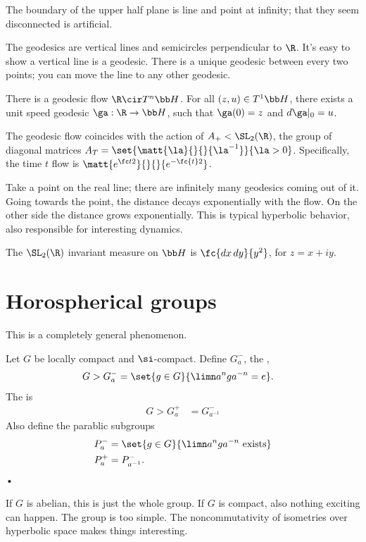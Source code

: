The boundary of the upper half plane is line and point at infinity; that they seem disconnected is artificial.

The geodesics are vertical lines and semicircles perpendicular to $\R$. It's easy to show a vertical line is a geodesic. There is a unique geodesic between every two points; you can move the line to any other geodesic.

There is a geodesic flow $\R\cir T^n\bb H$. For all $(z,u)\in T^1\bb H$, there exists a unit speed geodesic $\ga:\R\to \bb H$, such that $\ga(0)=z$ and $d\ga|_0=u$. %

\begin{pr}
The geodesic flow coincides with the action of $A_+<\SL_2(\R)$, the group of diagonal matrices $A_T=\set{\matt{\la}{}{}{\la^{-1}}}{\la >0}$. Specifically, the time $t$ flow is $\matt{e^{\fc t2}}{}{}{e^{-\fc{t}2}}$. 
\end{pr}
Take a point on the real line; there are infinitely many geodesics coming out of it.
Going towards the point, the distance decays exponentially with the flow.
On the other side the distance grows exponentially. This is typical hyperbolic behavior, also responsible for interesting dynamics.

The $\SL_2(\R)$ invariant measure on $\bb H$ is $\fc{dx\,dy}{y^2}$, for $z=x+iy$. 
\section{Horospherical groups}

This is a completely general phenomenon. 
\begin{df}
Let $G$ be locally compact and $\si$-compact. 
Define $G_a^-$, the ,
\begin{align}
G>G_a^- & = \set{g\in G}{\limn a^n g a^{-n}=e}.
\end{align}
The  is
\begin{align}
G>G_a^+& = G_{a^{-1}}^-
\end{align}
Also define the parablic subgroups
\begin{align}
P_a^- &= \set{g\in G}{\limn a^n ga^{-n}\text{ exists}}\\
P_a^+ &= P_{a^{-1}}^-.
\end{align}•
\end{df} 
If $G$ is abelian, this is just the whole group. If $G$ is compact, also nothing exciting can happen. The group is too simple. %
The noncommutativity of isometries over hyperbolic space makes things interesting.


